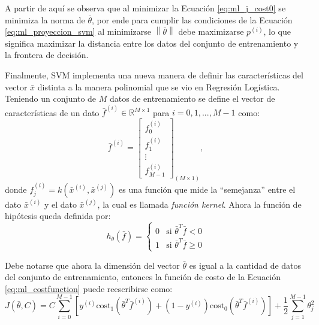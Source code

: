 A partir de aquí se observa que al minimizar la Ecuación \ref{eq:ml_j_cost0} se minimiza la norma de $\bar{\theta}$, por ende para cumplir las condiciones de la Ecuación \ref{eq:ml_proyeccion_svm} al minimizarse $\left\| \bar{\theta} \right \|$ debe maximizarse $p^{(i)}$, lo que significa maximizar la distancia entre los datos del conjunto de entrenamiento y la frontera de decisión.

Finalmente, SVM implementa una nueva manera de definir las características del vector $\bar{x}$ distinta a la manera polinomial que se vio en Regresión Logística. Teniendo un conjunto de $M$ datos de entrenamiento se define el vector de características de un dato $\bar{f}^{(i)}\in \mathbb{R}^{M\times 1}$ para $i=0,1,...,M-1$ como:
\begin{equation}
  \bar{f}^{(i)}=\begin{bmatrix}
    f_0^{(i)} \\
    f_1^{(i)} \\
    \vdots    \\
    f_{M-1}^{(i)}
  \end{bmatrix}_{(M\times 1)} ,
\end{equation}
donde $f_j^{(i)}=k(\bar{x}^{(i)},\bar{x}^{(j)})$ es una función que mide la ``semejanza'' entre el dato $\bar{x}^{(i)}$ y el dato $\bar{x}^{(j)}$, la cual es llamada \emph{función kernel}. Ahora la función de hipótesis queda definida por:
\begin{equation}
  h_{\bar{\theta}}(\bar{f})=\left\{\begin{matrix}
    0 & \textrm{si }\bar{\theta}^T \bar{f} < 0    \\
    1 & \textrm{si }\bar{\theta}^T \bar{f} \geq 0
  \end{matrix}\right.
  \label{eq:ml_hipkernel_svm}
\end{equation}

Debe notarse que ahora la dimensión del vector $\bar{\theta}$ es igual a la cantidad de datos del conjunto de entrenamiento, entonces la función de costo de la Ecuación \ref{eq:ml_costfunction} puede reescribirse como:
\begin{equation}
  J(\bar{\theta},C)= C\sum_{i=0}^{M-1} \left[y^{(i)} \mathrm{cost}_1 (\bar{\theta}^T \bar{f}^{(i)}) + (1-y^{(i)}) \mathrm{cost}_0 (\bar{\theta}^T \bar{f}^{(i)}) \right]+\frac{1}{2}\sum_{j=1}^{M-1}\theta_j^2
  \label{eq:ml_costfunctionkernel_svm}
\end{equation}

